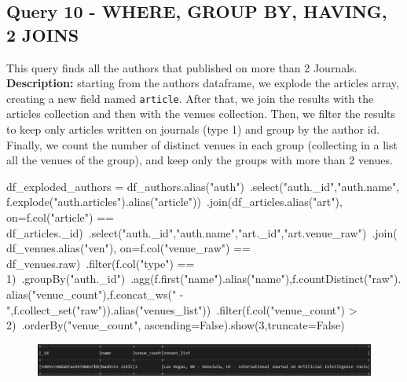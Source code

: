\documentclass{Configuration_Files/PoliMi3i_thesis}
\begin{document}
\subsection{Query 10 - WHERE, GROUP BY, HAVING, 2 JOINS}
This query finds  all the authors that published on more than 2 Journals.\newline
\textbf{Description:}  starting from the authors dataframe, we explode the articles array, creating a new field named \verb|article|.
After that, we join the results with the articles collection and then with the venues collection. Then, we filter the results to keep
only articles written on journals (type 1) and group by the author id. Finally, we count the number of distinct venues in each group
(collecting in a list all the venues of the group), and keep only the groups with more than 2 venues.
\begin{python}
df_exploded_authors = df_authors.alias("auth")\
                        .select("auth._id","auth.name", f.explode("auth.articles").alias("article"))\
                        .join(df_articles.alias("art"), on=f.col("article") == df_articles._id)\
                        .select("auth._id","auth.name","art._id","art.venue_raw")\
                        .join(df_venues.alias("ven"), on=f.col("venue_raw") == df_venues.raw)\
                        .filter(f.col("type") == 1)\
                        .groupBy("auth._id")\
                        .agg(f.first("name").alias("name"),f.countDistinct("raw").alias("venue_count"),f.concat_ws(" - ",f.collect_set("raw")).alias("venues_list"))\
                        .filter(f.col("venue_count") > 2)\
                        .orderBy("venue_count", ascending=False).show(3,truncate=False)
\end{python}
\begin{figure}[H]
\centering
\includegraphics[width=1\textwidth]{query/spark_q10.PNG}
\label{fig:query10}
\end{figure}
\end{document}

